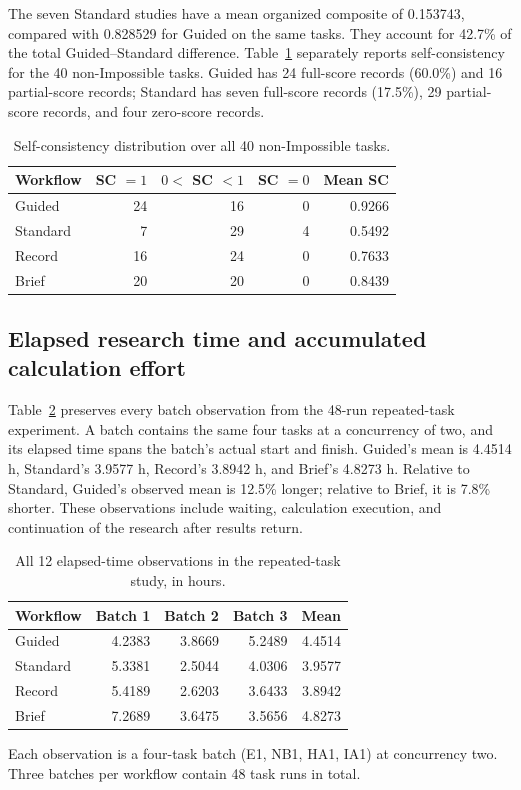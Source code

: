 The seven Standard studies have a mean organized composite of 0.153743, compared with 0.828529 for Guided on the same tasks. They account for 42.7\% of the total Guided--Standard difference. Table~\ref{tab:si-sc-distribution} separately reports self-consistency for the 40 non-Impossible tasks. Guided has 24 full-score records (60.0\%) and 16 partial-score records; Standard has seven full-score records (17.5\%), 29 partial-score records, and four zero-score records.

\begin{table}[!htbp]
\centering
\small
\caption{Self-consistency distribution over all 40 non-Impossible tasks.}
\label{tab:si-sc-distribution}
\begin{tabular}{lrrrr}
\toprule
Workflow & SC $=1$ & $0<$ SC $<1$ & SC $=0$ & Mean SC \\
\midrule
Guided & 24 & 16 & 0 & 0.9266 \\
Standard & 7 & 29 & 4 & 0.5492 \\
Record & 16 & 24 & 0 & 0.7633 \\
Brief & 20 & 20 & 0 & 0.8439 \\
\bottomrule
\end{tabular}
\end{table}

\subsection{Elapsed research time and accumulated calculation effort}

Table~\ref{tab:si-batch-times} preserves every batch observation from the 48-run repeated-task experiment. A batch contains the same four tasks at a concurrency of two, and its elapsed time spans the batch's actual start and finish. Guided's mean is 4.4514 h, Standard's 3.9577 h, Record's 3.8942 h, and Brief's 4.8273 h. Relative to Standard, Guided's observed mean is 12.5\% longer; relative to Brief, it is 7.8\% shorter. These observations include waiting, calculation execution, and continuation of the research after results return.

\begin{table}[!htbp]
\centering
\small
\caption{All 12 elapsed-time observations in the repeated-task study, in hours.}
\label{tab:si-batch-times}
\begin{tabular}{lrrrr}
\toprule
Workflow & Batch 1 & Batch 2 & Batch 3 & Mean \\
\midrule
Guided & 4.2383 & 3.8669 & 5.2489 & 4.4514 \\
Standard & 5.3381 & 2.5044 & 4.0306 & 3.9577 \\
Record & 5.4189 & 2.6203 & 3.6433 & 3.8942 \\
Brief & 7.2689 & 3.6475 & 3.5656 & 4.8273 \\
\bottomrule
\end{tabular}
\par\smallskip\begin{minipage}{\linewidth}\footnotesize Each observation is a four-task batch (E1, NB1, HA1, IA1) at concurrency two. Three batches per workflow contain 48 task runs in total.\end{minipage}
\end{table}

